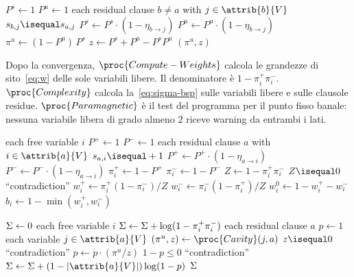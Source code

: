 \begin{codebox}
\li $P^s \gets 1$
\li $P^u \gets 1$
\li \For each residual clause $b \neq a$ with $j \in \attrib{b}{V}$
\li     \Do
            \If $s_{b,j} \isequal s_{a,j}$
\li             \Then $P^s \gets P^s \cdot (1 - \eta_{b \to j})$
\li             \Else $P^u \gets P^u \cdot (1 - \eta_{b \to j})$
                \End
        \End
\li $\pi^u \gets (1 - P^u) \, P^s$
\li $z \gets P^s + P^u - P^s P^u$
\li \Return $(\pi^u, z)$
\end{codebox}

Dopo la convergenza, $\proc{Compute-Weights}$ calcola le grandezze di sito~\eqref{eq:w} delle sole variabili libere.
Il denominatore è $1-\pi_i^+\pi_i^-$.
$\proc{Complexity}$ calcola la~\eqref{eq:sigma-bsp} sulle variabili libere e sulle clausole residue.
$\proc{Paramagnetic}$ è il test del programma per il punto fisso banale: nessuna variabile libera di grado almeno $2$ riceve warning da entrambi i lati.

\begin{codebox}
\li \For each free variable $i$
\li     \Do
            $P^+ \gets 1$
\li         $P^- \gets 1$
\li         \For each residual clause $a$ with $i \in \attrib{a}{V}$
\li             \Do
                    \If $s_{a,i} \isequal +1$
\li                     \Then $P^+ \gets P^+ \cdot (1 - \eta_{a \to i})$
\li                     \Else $P^- \gets P^- \cdot (1 - \eta_{a \to i})$
                        \End
                \End
\li         $\pi_i^+ \gets 1 - P^+$
\li         $\pi_i^- \gets 1 - P^-$
\li         $Z \gets 1 - \pi_i^+ \pi_i^-$
\li         \If $Z \isequal 0$
\li             \Then \Error ``contradiction''
                \End
\li         $w_i^+ \gets \pi_i^+ (1 - \pi_i^-) / Z$
\li         $w_i^- \gets \pi_i^- (1 - \pi_i^+) / Z$
\li         $w_i^0 \gets 1 - w_i^+ - w_i^-$
\li         $b_i \gets 1 - \min(w_i^+, w_i^-)$
        \End
\end{codebox}

\begin{codebox}
\li $\Sigma \gets 0$
\li \For each free variable $i$
\li     \Do $\Sigma \gets \Sigma + \log(1 - \pi_i^+ \pi_i^-)$
        \End
\li \For each residual clause $a$
\li     \Do
            $p \gets 1$
\li         \For each variable $j \in \attrib{a}{V}$
\li             \Do
                    $(\pi^u, z) \gets \proc{Cavity}(j, a)$
\li                 \If $z \isequal 0$
\li                     \Then \Error ``contradiction''
                        \End
\li                 $p \gets p \cdot (\pi^u / z)$
                \End
\li         \If $1 - p \leq 0$
\li             \Then \Error ``contradiction''
                \End
\li         $\Sig \gets \Sig + (1 - |\attrib{a}{V}|) \log(1 - p)$
        \End
\li \Return $\Sigma$
\end{codebox}

